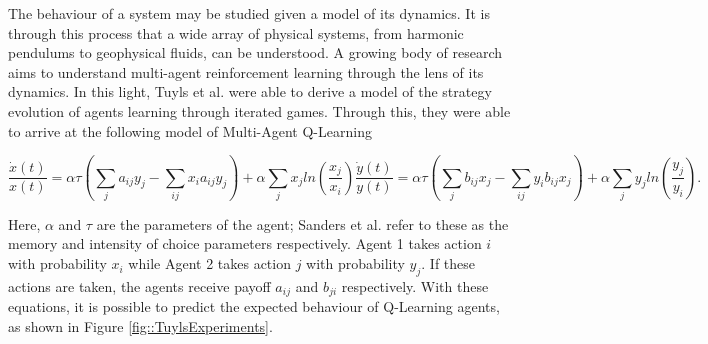 \documentclass[.../main.tex]{subfiles}
\begin{document}
    The behaviour of a system may be studied given a model of its
    dynamics. It is through this process that a wide array of physical
    systems, from harmonic pendulums to geophysical fluids, can be
    understood. A growing body of research aims to understand
    multi-agent reinforcement learning through the lens of its
    dynamics. In this light, Tuyls et al. \cite{Tuyls2006AnGames} were
    able to derive a model of the strategy evolution of agents
    learning through iterated games.  Through this, they were able to
    arrive at the following model of Multi-Agent Q-Learning

    \begin{subequations}
    \label{eqn::EOM}
        \begin{equation}
            \frac{\dot{x}(t)}{x(t)} = \alpha \tau (\sum_{j} a_{ij} y_j - \sum_{i j} x_i a_{ij} y_j)
            + \alpha \sum_j x_j ln(\frac{x_j}{x_i}) 
        \end{equation}
        \begin{equation}
            \frac{\dot{y}(t)}{y(t)} = \alpha \tau (\sum_{j} b_{ij} x_j - \sum_{i j} y_i b_{ij} x_j)
            + \alpha \sum_j y_j ln(\frac{y_j}{y_i}).
        \end{equation}
    \end{subequations}

    Here, $\alpha$ and $\tau$ are the parameters of the agent; Sanders et al. refer to these as the
    memory and intensity of choice parameters respectively. Agent 1 takes action $i$ with probability
    $x_i$ while Agent 2 takes action $j$ with probability $y_j$. If these actions are taken, the agents
    receive payoff $a_{ij}$ and $b_{ji}$ respectively. With these equations, it is possible to
    predict the expected behaviour of Q-Learning agents, as shown in Figure 
    \ref{fig::TuylsExperiments}.
\end{document}
